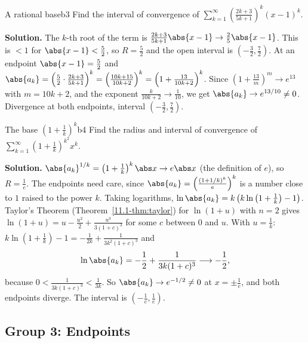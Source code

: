 \documentclass[11pt]{article}
\begin{document}
\begin{exmp}{A rational base}{b3}
Find the interval of convergence of $\displaystyle\sum_{k=1}^\infty\left(\frac{2k+3}{5k+1}\right)^k(x-1)^k$.

\textbf{Solution.} The $k$-th root of the term is $\frac{2k+3}{5k+1}\abs{x-1}\to\frac25\abs{x-1}$. This is $<1$ for $\abs{x-1}<\frac52$, so $R=\frac52$ and the open interval is $\left(-\frac32,\frac72\right)$. At an endpoint $\abs{x-1}=\frac52$ and $\abs{a_k}=\left(\frac52\cdot\frac{2k+3}{5k+1}\right)^k=\left(\frac{10k+15}{10k+2}\right)^k=\left(1+\frac{13}{10k+2}\right)^k$. Since $\left(1+\frac{13}m\right)^m\to e^{13}$ with $m=10k+2$, and the exponent $\frac k{10k+2}\to\frac1{10}$, we get $\abs{a_k}\to e^{13/10}\ne0$. Divergence at both endpoints, interval $\left(-\frac32,\frac72\right)$.
\end{exmp}

\begin{exmp}{The base $\left(1+\frac1k\right)^k$}{b4}
Find the radius and interval of convergence of $\displaystyle\sum_{k=1}^\infty\left(1+\frac1k\right)^{k^2}x^k$.

\textbf{Solution.} $\abs{a_k}^{1/k}=\left(1+\frac1k\right)^k\abs x\to e\abs x$ (the definition of $e$), so $R=\frac1e$. The endpoints need care, since $\abs{a_k}=\left(\frac{(1+1/k)^k}e\right)^k$ is a number close to $1$ raised to the power $k$. Taking logarithms, $\ln\abs{a_k}=k\left(k\ln\left(1+\tfrac1k\right)-1\right)$. Taylor's Theorem (Theorem~\ref{11.1-thm:taylor}) for $\ln(1+u)$ with $n=2$ gives $\ln(1+u)=u-\frac{u^2}2+\frac{u^3}{3(1+c)^3}$ for some $c$ between $0$ and $u$. With $u=\frac1k$: $k\ln(1+\frac1k)-1=-\frac1{2k}+\frac1{3k^2(1+c)^3}$ and
\[
\ln\abs{a_k}=-\frac12+\frac1{3k(1+c)^3}\longrightarrow-\frac12 ,
\]
because $0<\frac1{3k(1+c)^3}<\frac1{3k}$. So $\abs{a_k}\to e^{-1/2}\ne0$ at $x=\pm\frac1e$, and both endpoints diverge. The interval is $\left(-\frac1e,\frac1e\right)$.
\end{exmp}

\subsection*{Group 3: Endpoints}
\end{document}
